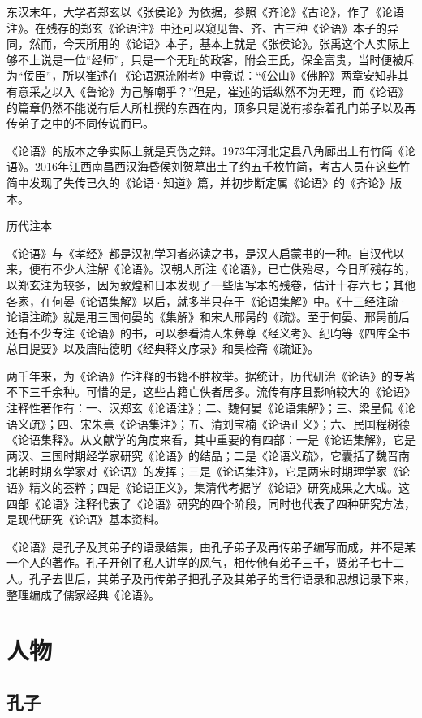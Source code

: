 \documentclass[a4paper,12pt,UTF8,twoside]{ctexbook}
\begin{document}
东汉末年，大学者郑玄以《张侯论》为依据，参照《齐论》《古论》，作了《论语注》。在残存的郑玄《论语注》中还可以窥见鲁、齐、古三种《论语》本子的异同，然而，今天所用的《论语》本子，基本上就是《张侯论》。张禹这个人实际上够不上说是一位“经师”，只是一个无耻的政客，附会王氏，保全富贵，当时便被斥为“佞臣”，所以崔述在《论语源流附考》中竟说：“《公山》《佛肸》两章安知非其有意采之以入《鲁论》为己解嘲乎？”但是，崔述的话纵然不为无理，而《论语》的篇章仍然不能说有后人所杜撰的东西在内，顶多只是说有掺杂着孔门弟子以及再传弟子之中的不同传说而已。

《论语》的版本之争实际上就是真伪之辩。1973年河北定县八角廊出土有竹简《论语》。2016年江西南昌西汉海昏侯刘贺墓出土了约五千枚竹简，考古人员在这些竹简中发现了失传已久的《论语·知道》篇，并初步断定属《论语》的《齐论》版本。

历代注本

《论语》与《孝经》都是汉初学习者必读之书，是汉人启蒙书的一种。自汉代以来，便有不少人注解《论语》。汉朝人所注《论语》，已亡佚殆尽，今日所残存的，以郑玄注为较多，因为敦煌和日本发现了一些唐写本的残卷，估计十存六七；其他各家，在何晏《论语集解》以后，就多半只存于《论语集解》中。《十三经注疏·论语注疏》就是用三国何晏的《集解》和宋人邢昺的《疏》。至于何晏、邢昺前后还有不少专注《论语》的书，可以参看清人朱彝尊《经义考》、纪昀等《四库全书总目提要》以及唐陆德明《经典释文序录》和吴检斋《疏证》。

两千年来，为《论语》作注释的书籍不胜枚举。据统计，历代研治《论语》的专著不下三千余种。可惜的是，这些古籍亡佚者居多。流传有序且影响较大的《论语》注释性著作有：一、汉郑玄《论语注》；二、魏何晏《论语集解》；三、梁皇侃《论语义疏》；四、宋朱熹《论语集注》；五、清刘宝楠《论语正义》；六、民国程树德《论语集释》。从文献学的角度来看，其中重要的有四部：一是《论语集解》，它是两汉、三国时期经学家研究《论语》的结晶；二是《论语义疏》，它囊括了魏晋南北朝时期玄学家对《论语》的发挥；三是《论语集注》，它是两宋时期理学家《论语》精义的荟粹；四是《论语正义》，集清代考据学《论语》研究成果之大成。这四部《论语》注释代表了《论语》研究的四个阶段，同时也代表了四种研究方法，是现代研究《论语》基本资料。

《论语》是孔子及其弟子的语录结集，由孔子弟子及再传弟子编写而成，并不是某一个人的著作。孔子开创了私人讲学的风气，相传他有弟子三千，贤弟子七十二人。孔子去世后，其弟子及再传弟子把孔子及其弟子的言行语录和思想记录下来，整理编成了儒家经典《论语》。


\part{人物}

\chapter{孔子}
\end{document}
